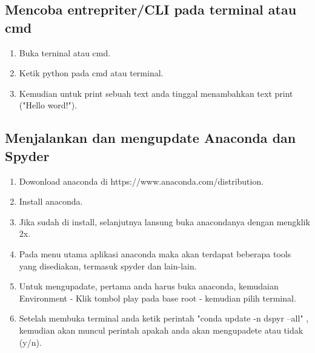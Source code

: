 \documentclass{article}
\begin{document}
\subsection{Mencoba entrepriter/CLI pada terminal atau cmd}
    \begin{enumerate}
        \item Buka terninal atau cmd.
        \item Ketik python pada cmd atau terminal.
        \item Kemudian untuk print sebuah text anda tinggal menambahkan text print ("Hello word!").
    \end{enumerate}


\subsection{Menjalankan dan mengupdate Anaconda dan Spyder}
    \begin{enumerate}
        \item Dowonload anaconda di https://www.anaconda.com/distribution.
        \item Install anaconda.
        \item Jika sudah di install, selanjutnya lansung buka anacondanya dengan mengklik 2x.
        \item Pada menu utama aplikasi anaconda maka akan terdapat beberapa tools yang disediakan, termasuk spyder dan lain-lain.
        \item Untuk mengupadate, pertama anda harus buka anaconda, kemudaian Environment - Klik tombol play pada base root - kemudian pilih terminal.
        \item Setelah membuka terminal anda ketik perintah "conda update -n dspyr --all" , kemudian akan muncul perintah apakah anda akan mengupadete atau tidak (y/n).
\end{enumerate}
\end{document}
